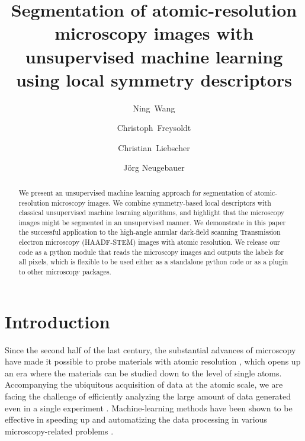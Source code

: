 \documentclass[twocolumn,amsmath, floatfix]{revtex4}
\begin{document}
\title { Segmentation of atomic-resolution microscopy images with unsupervised machine learning using local symmetry descriptors}
\author{Ning~Wang}
\author{Christoph~Freysoldt}
\author{Christian~Liebscher}
\author{J{\"o}rg Neugebauer}
\begin{abstract}

We present an unsupervised machine learning approach for segmentation of 
atomic-resolution microscopy images. 
We combine symmetry-based local descriptors with classical unsupervised machine learning algorithms, and highlight that the microscopy images might be segmented in an unsupervised manner. We demonstrate in this paper the successful application to the high-angle annular dark-field scanning Transmission electron microscopy (HAADF-STEM) images with atomic resolution.
We release our code as a python module that reads the microscopy images and outputs the labels for all pixels, which is flexible to be used either as a standalone python code or as a plugin to other microscopy packages. 

\end{abstract}

\maketitle

\section{Introduction}
Since the second half of the last century, the substantial advances of microscopy have made it possible to probe materials with atomic resolution \cite{Hansma209}, which opens up an era where the materials can be studied down to the level of single atoms. 
Accompanying the ubiquitous acquisition of data at the atomic scale, we are facing the challenge of efficiently analyzing the large amount of data generated even in a single experiment \cite{Sergei2015}. Machine-learning methods have been shown to be effective in speeding up and automatizing the data processing in various microscopy-related problems \cite{Kaufmann2020,Sergei2019, Sergei2020}.
\end{document}
